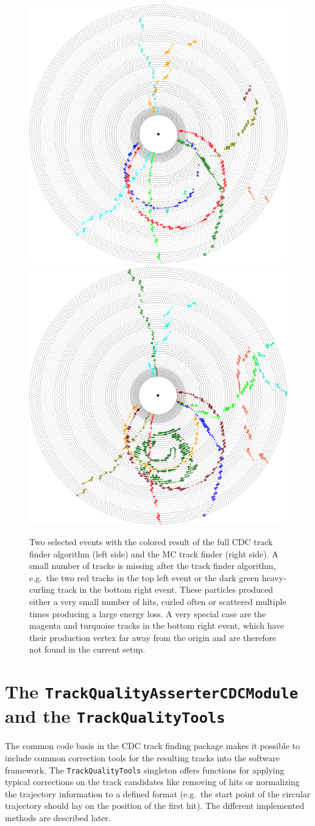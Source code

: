 \begin{figure}
  \includegraphics[width=0.48\linewidth]{figures/workflow/event_display_finder_2.pdf}
  \includegraphics[width=0.48\linewidth]{figures/workflow/event_display_mc_2.pdf}
  \caption{Two selected events with the colored result of the full CDC track finder algorithm (left side) and the MC track finder (right side). A small number of tracks is missing after the track finder algorithm, e.g.\ the two red tracks in the top left event or the dark green heavy-curling track in the bottom right event. These particles produced either a very small number of hits, curled often or scattered multiple times producing a large energy loss. A very special case are the magenta and turquoise tracks in the bottom right event, which have their production vertex far away from the origin and are therefore not found in the current setup.}
  \label{fig-event-displays-final}
\end{figure}


\section{The \texttt{Track\-Quality\-Asserter\-CDC\-Module} and the \texttt{Track\-Quality\-Tools}}  \label{section-quality}

The common code basis in the CDC track finding package makes it possible to include common correction tools for the resulting tracks into the software framework. The \texttt{Track\-Quality\-Tools} singleton offers functions for applying typical corrections on the track candidates like removing of hits or normalizing the trajectory information to a defined format (e.g.\ the start point of the circular trajectory should lay on the position of the first hit). The different implemented methods are described later.

